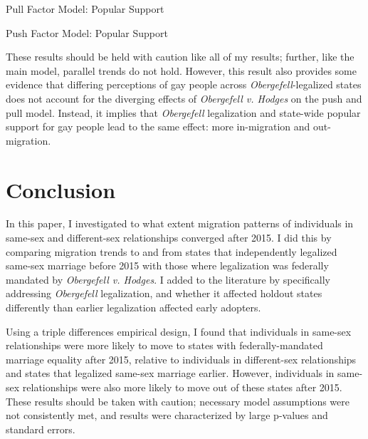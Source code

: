\documentclass[12pt,letterpaper]{article}
\begin{document}
\begin{table}[htbp] %
    \centering
    \caption{Pull Factor Model: Popular Support}
    \label{tab: popsupport_expost_model}
    
\end{table}
\begin{table}[htbp]
    \centering
    \caption{Push Factor Model: Popular Support}
    \label{tab: popsupport_exante_model}
    
\end{table}

These results should be held with caution like all of my results; further, like the main model, parallel trends do not hold. However, this result also provides some evidence that differing perceptions of gay people across \textit{Obergefell}-legalized states does not account for the diverging effects of \textit{Obergefell v. Hodges} on the push and pull model. Instead, it implies that \textit{Obergefell} legalization and state-wide popular support for gay people lead to the same effect: more in-migration and out-migration.

\FloatBarrier %
\section{Conclusion}

In this paper, I investigated to what extent migration patterns of individuals in same-sex and different-sex relationships converged after 2015. I did this by comparing migration trends to and from states that independently legalized same-sex marriage before 2015 with those where legalization was federally mandated by \textit{Obergefell v. Hodges}. I added to the literature by specifically addressing \textit{Obergefell} legalization, and whether it affected holdout states differently than earlier legalization affected early adopters.

Using a triple differences empirical design, I found that individuals in same-sex relationships were more likely to move to states with federally-mandated marriage equality after 2015, relative to individuals in different-sex relationships and states that legalized same-sex marriage earlier. However, individuals in same-sex relationships were also more likely to move out of these states after 2015. These results should be taken with caution; necessary model assumptions were not consistently met, and results were characterized by large p-values and standard errors.
\end{document}
